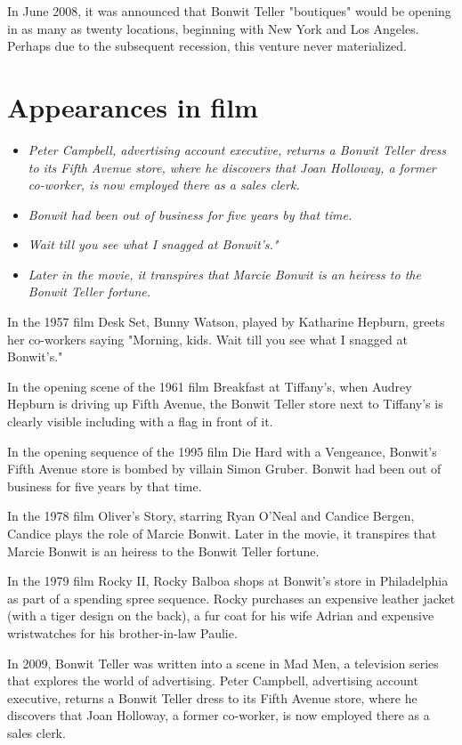 In June 2008, it was announced that Bonwit Teller "boutiques" would be
opening in as many as twenty locations, beginning with New York and Los
Angeles. Perhaps due to the subsequent recession, this venture never
materialized.

\section{Appearances in film}\label{appearances-in-film}

\begin{itemize}
\item
  \emph{Peter Campbell, advertising account executive, returns a Bonwit
  Teller dress to its Fifth Avenue store, where he discovers that Joan
  Holloway, a former co-worker, is now employed there as a sales clerk.}
\item
  \emph{Bonwit had been out of business for five years by that time.}
\item
  \emph{Wait till you see what I snagged at Bonwit's."}
\item
  \emph{Later in the movie, it transpires that Marcie Bonwit is an
  heiress to the Bonwit Teller fortune.}
\end{itemize}

In the 1957 film Desk Set, Bunny Watson, played by Katharine Hepburn,
greets her co-workers saying "Morning, kids. Wait till you see what I
snagged at Bonwit's."

In the opening scene of the 1961 film Breakfast at Tiffany's, when
Audrey Hepburn is driving up Fifth Avenue, the Bonwit Teller store next
to Tiffany's is clearly visible including with a flag in front of it.

In the opening sequence of the 1995 film Die Hard with a Vengeance,
Bonwit's Fifth Avenue store is bombed by villain Simon Gruber. Bonwit
had been out of business for five years by that time.

In the 1978 film Oliver's Story, starring Ryan O'Neal and Candice
Bergen, Candice plays the role of Marcie Bonwit. Later in the movie, it
transpires that Marcie Bonwit is an heiress to the Bonwit Teller
fortune.

In the 1979 film Rocky II, Rocky Balboa shops at Bonwit's store in
Philadelphia as part of a spending spree sequence. Rocky purchases an
expensive leather jacket (with a tiger design on the back), a fur coat
for his wife Adrian and expensive wristwatches for his brother-in-law
Paulie.

In 2009, Bonwit Teller was written into a scene in Mad Men, a television
series that explores the world of advertising. Peter Campbell,
advertising account executive, returns a Bonwit Teller dress to its
Fifth Avenue store, where he discovers that Joan Holloway, a former
co-worker, is now employed there as a sales clerk.

